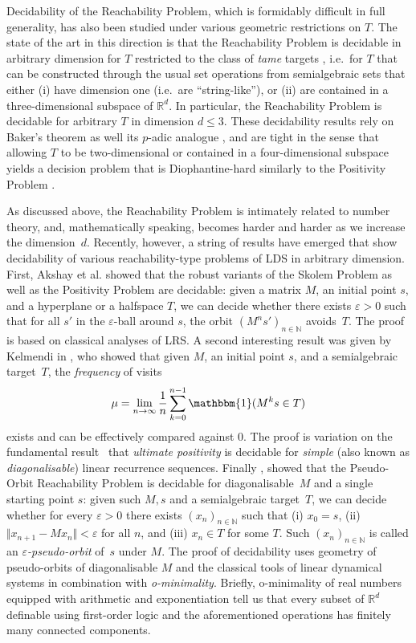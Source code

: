 \documentclass[a4paper,UKenglish,cleveref]{lipics-v2021}
\newcommand{\nat}{\mathbb{N}}
\newcommand{\rel}{\mathbb{R}}
\newcommand{\seq}[1]{(#1)_{n \in \mathbb{N}}}
\begin{document}
Decidability of the Reachability Problem, which is formidably difficult in full generality, has also been studied under various geometric restrictions on $T$.
The state of the art in this direction is that the Reachability Problem is decidable in arbitrary dimension for $T$ restricted to the class of \emph{tame} targets \cite{karimovPOPL2}, i.e.\ for $T$ that can be constructed through the usual set operations from semialgebraic sets that either (i) have dimension one (i.e.\ are ``string-like''), or (ii) are contained in a three-dimensional subspace of $\rel^d$.
In particular, the Reachability Problem is decidable for arbitrary $T$ in dimension $d\le 3$.
These decidability results rely on Baker's theorem \cite{baker-rational-sharp-version-1993} as well its $p$-adic analogue \cite{yu-padic-baker}, and are tight in the sense that allowing $T$ to be two-dimensional or contained in a four-dimensional subspace yields a decision problem that is Diophantine-hard similarly to the Positivity Problem \cite[Chap.~8]{karimov-thesis}.

As discussed above, the Reachability Problem is intimately related to number theory, and, mathematically speaking, becomes harder and harder as we increase the dimension~$d$.
Recently, however, a string of results have emerged that show decidability of various reachability-type problems of LDS in arbitrary dimension.
First, Akshay et al. \cite{akshay2024robustness} showed that the robust variants of the Skolem Problem as well as the Positivity Problem are decidable: given a matrix $M$, an initial point $s$, and a hyperplane or a halfspace $T$, we can decide whether there exists $\varepsilon > 0$ such that for all $s'$ in the $\varepsilon$-ball around $s$, the orbit $\seq{M^ns'}$ avoids~$T$. 
The proof is based on classical analyses of LRS.
A second interesting result was given by Kelmendi in \cite{kelmendi2023computing}, who showed that given $M$, an initial point $s$, and a semialgebraic target~$T$, the \emph{frequency} of visits
\[
\mu = \lim_{n\to \infty} \frac 1 n \sum_{k=0}^{n-1} \mathbbm{1}(M^k s \in T)
\]
exists and can be effectively compared against 0.
The proof is variation on the fundamental result~\cite{joel-ult-pos-simple} that \emph{ultimate positivity} is decidable for \emph{simple} (also known as \emph{diagonalisable}) linear recurrence sequences.
Finally \cite{d2022pseudo}, showed that the Pseudo-Orbit Reachability Problem is decidable for diagonalisable~$M$ and a single starting point $s$: given such $M,s$ and a semialgebraic target~$T$, we can decide whether for every $\varepsilon>0$ there exists $(x_n)_{n\in\nat}$ such that (i) $x_0 = s$, (ii) $\Vert x_{n+1} - Mx_n\Vert < \varepsilon$ for all $n$, and (iii) $x_n \in T$ for some $T$.
Such $(x_n)_{n\in\nat}$ is called an \emph{$\varepsilon$-pseudo-orbit} of~$s$ under $M$.
The proof of decidability uses geometry of pseudo-orbits of diagonalisable $M$ and the classical tools of linear dynamical systems in combination with \emph{o-minimality}.
Briefly, o-minimality of real numbers equipped with arithmetic and exponentiation tell us that every subset of $\rel^d$ definable using first-order logic and the aforementioned operations has finitely many connected components.
\end{document}
